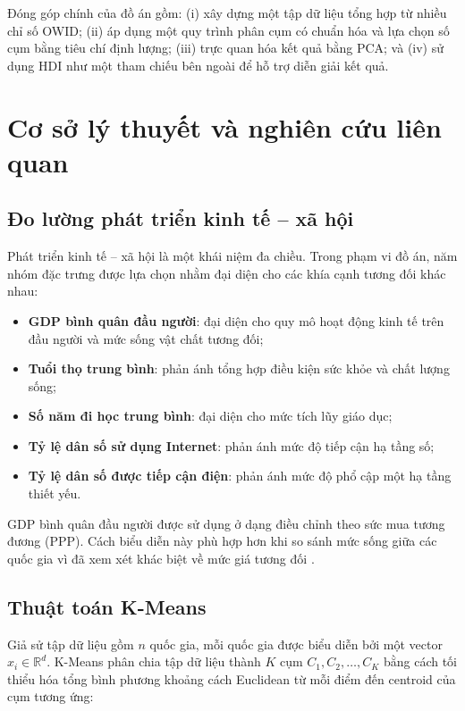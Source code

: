 \documentclass[11pt,a4paper]{article}
\begin{document}
Đóng góp chính của đồ án gồm: (i) xây dựng một tập dữ liệu tổng hợp từ nhiều chỉ số OWID; (ii) áp dụng một quy trình phân cụm có chuẩn hóa và lựa chọn số cụm bằng tiêu chí định lượng; (iii) trực quan hóa kết quả bằng PCA; và (iv) sử dụng HDI như một tham chiếu bên ngoài để hỗ trợ diễn giải kết quả.

\section{Cơ sở lý thuyết và nghiên cứu liên quan}

\subsection{Đo lường phát triển kinh tế -- xã hội}

Phát triển kinh tế -- xã hội là một khái niệm đa chiều. Trong phạm vi đồ án, năm nhóm đặc trưng được lựa chọn nhằm đại diện cho các khía cạnh tương đối khác nhau:

\begin{itemize}
    \item \textbf{GDP bình quân đầu người}: đại diện cho quy mô hoạt động kinh tế trên đầu người và mức sống vật chất tương đối;
    \item \textbf{Tuổi thọ trung bình}: phản ánh tổng hợp điều kiện sức khỏe và chất lượng sống;
    \item \textbf{Số năm đi học trung bình}: đại diện cho mức tích lũy giáo dục;
    \item \textbf{Tỷ lệ dân số sử dụng Internet}: phản ánh mức độ tiếp cận hạ tầng số;
    \item \textbf{Tỷ lệ dân số được tiếp cận điện}: phản ánh mức độ phổ cập một hạ tầng thiết yếu.
\end{itemize}

GDP bình quân đầu người được sử dụng ở dạng điều chỉnh theo sức mua tương đương (PPP). Cách biểu diễn này phù hợp hơn khi so sánh mức sống giữa các quốc gia vì đã xem xét khác biệt về mức giá tương đối \cite{owid_gdp}.

\subsection{Thuật toán K-Means}

Giả sử tập dữ liệu gồm $n$ quốc gia, mỗi quốc gia được biểu diễn bởi một vector $x_i \in \mathbb{R}^{d}$. K-Means phân chia tập dữ liệu thành $K$ cụm $C_1, C_2, \ldots, C_K$ bằng cách tối thiểu hóa tổng bình phương khoảng cách Euclidean từ mỗi điểm đến centroid của cụm tương ứng:
\end{document}
